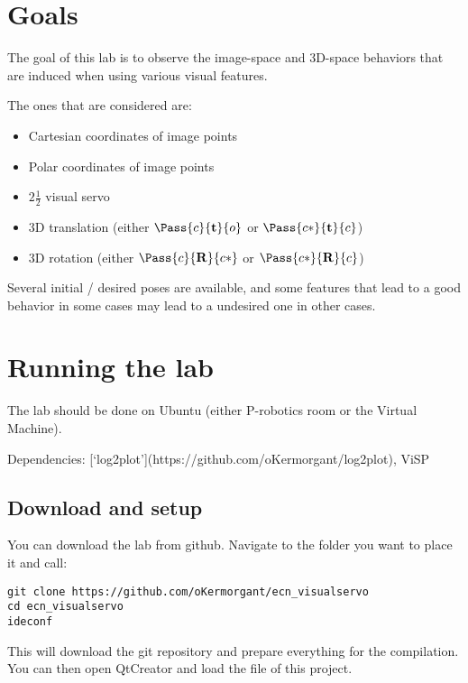 \documentclass{ecnreport}
\author{O. Kermorgant}
\begin{document}


\section{Goals}

The goal of this lab is to observe the image-space and 3D-space behaviors that are induced when using various visual features.

The ones that are considered are:
\begin{itemize}
 \item Cartesian coordinates of image points
 \item Polar coordinates of image points
 \item $2\frac{1}{2}$ visual servo
 \item 3D translation (either $\Pass{c}{\mathbf{t}}{o}$ or $\Pass{c*}{\mathbf{t}}{c}$)
 \item 3D rotation (either $\Pass{c}{\mathbf{R}}{c*}$ or $\Pass{c*}{\mathbf{R}}{c}$)
\end{itemize}

Several initial / desired poses are available, and some features that lead to a good behavior in some cases may lead to a undesired one in other cases.

\section{Running the lab}

The lab should be done on Ubuntu (either P-robotics room or the Virtual Machine).

Dependencies: [`log2plot'](https://github.com/oKermorgant/log2plot), ViSP

\subsection{Download and setup}

You can download the lab from github. Navigate to the folder you want to place it and call:
\begin{center}\bashstyle
\begin{lstlisting}
git clone https://github.com/oKermorgant/ecn_visualservo
cd ecn_visualservo
ideconf
\end{lstlisting}
\end{center}

This will download the git repository and prepare everything for the compilation.\\
You can then open QtCreator and load the  file of this project.
\end{document}
